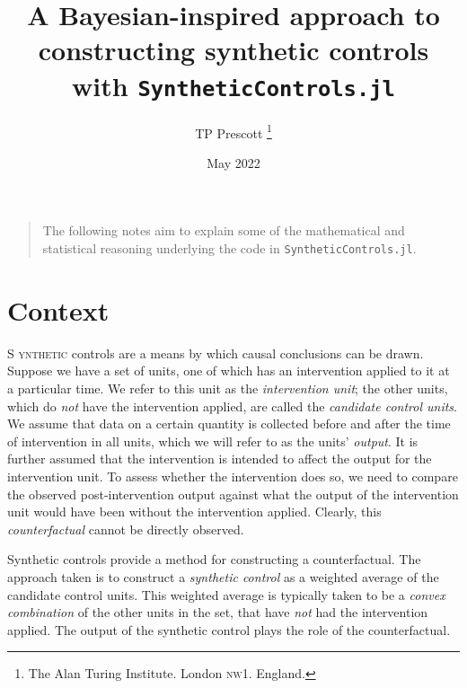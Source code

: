 \documentclass[a4paper, 12pt, onecolumn, singlepage]{article}
\newcommand{\TestLettrine}[2]{\needspace{3\baselineskip} \lettrine[lines=3]{#1}{ #2}}
\begin{document}
\title{A Bayesian-inspired approach to constructing synthetic controls with \texttt{SyntheticControls.jl}}
\author{TP Prescott
	\thanks{The Alan Turing Institute. London \textsc{nw1}. England.}
}
\date{May 2022}
\maketitle{}

\onehalfspacing

\begin{quotation}
\centering\noindent
The following notes aim to explain some of the mathematical and statistical reasoning
underlying the code in \texttt{SyntheticControls.jl}.
\end{quotation}

\section{Context}

\TestLettrine{S}{ynthetic}
controls are a means by which causal conclusions can be drawn.
Suppose we have a set of units, one of which has an intervention applied to it at a particular time.
We refer to this unit as the \emph{intervention unit};
the other units, which do \emph{not} have the intervention applied,
are called the \emph{candidate control units}.
We assume that data on a certain quantity is collected before and after the time of intervention in all units,
which we will refer to as the units' \emph{output}.
It is further assumed that the intervention is intended to affect the output for the intervention unit.
To assess whether the intervention does so, we need to compare the observed post-intervention output
against what the output of the intervention unit would have been without the intervention applied.
Clearly, this \emph{counterfactual} cannot be directly observed.

Synthetic controls provide a method for constructing a counterfactual.
The approach taken is to construct a \emph{synthetic control}
as a weighted average of the candidate control units.
This weighted average is typically taken to be a \emph{convex combination}
of the other units in the set, that have \emph{not} had the intervention applied.
The output of the synthetic control plays the role of the counterfactual.
\end{document}
